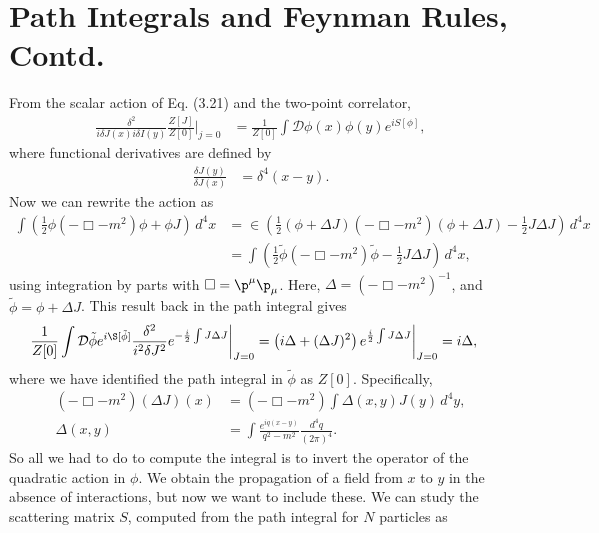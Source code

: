 \documentclass[a4paper, 11pt, normalem]{report}
\begin{document}
\chapter{Path Integrals and Feynman Rules, Contd.}
From the scalar action of Eq. (3.21) and the two-point correlator,
\begin{align}
    \frac{\delta^2}{i\delta J(x)i\delta I(y)}\frac{Z[J]}{Z[0]}\bigg|_{j=0} &= \frac{1}{Z[0]}\int \mathcal{D}\phi(x)\phi(y)e^{iS[\phi]},
\end{align}
where functional derivatives are defined by
\begin{align}
    \frac{\delta J(y)}{\delta J(x)} &= \delta^4(x-y).
\end{align}
Now we can rewrite the action as
\begin{align}
    \int \left(\frac12\phi(-\Box-m^2)\phi+\phi J\right)\,d^4x &= \in \left(\frac12(\phi+\Delta J)(-\Box-m^2)(\phi+\Delta J) - \frac12 J\Delta J\right)\,d^4x\\
                                                              &= \int \left(\frac12\tilde{\phi}(-\Box-m^2)\tilde{\phi} - \frac12 J\Delta J\right)\,d^4x,
\end{align}
using integration by parts with $\Box=\p^\mu\p_\mu$.
Here, $\Delta = (-\Box-m^2)^{-1}$, and $\tilde{\phi}=\phi+\Delta J$.
This result back in the path integral gives
\begin{align}
    \frac{1}{Z[0]}\int \mathcal{D}\tilde{\phi}e^{i\S[\tilde{\phi}]}\frac{\delta^2}{i^2\delta J^2}e^{-\frac{i}{2}\int J\Delta J}\bigg|_{J=0} &= \left(i\Delta + (\Delta J)^2\right)e^{\frac{i}{2}\int J\Delta J}\bigg|_{J=0} = i\Delta,
\end{align}
where we have identified the path integral in $\tilde{\phi}$ as $Z[0]$.
Specifically,
\begin{align}
    (-\Box-m^2)(\Delta J)(x) &= (-\Box-m^2)\int \Delta(x,y)J(y)\,d^4y, \\
    \Delta(x,y) &= \int \frac{e^{iq(x-y)}}{q^2-m^2}\frac{d^4q}{(2\pi)^4}.
\end{align}
So all we had to do to compute the integral is to invert the operator of the quadratic action in $\phi$.
We obtain the propagation of a field from $x$ to $y$ in the absence of interactions, but now we want to include these.
We can study the scattering matrix $S$, computed from the path integral for $N$ particles as
\end{document}
